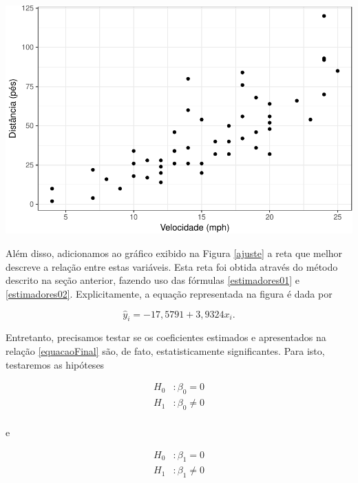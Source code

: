 \documentclass[a4paper,12pt,twoside,printwatermark=false]{modeloLEA}
\numberwithin{equation}{section}
\numberwithin{figure}{section}
\numberwithin{table}{section}
\begin{document}
\begin{center}\includegraphics{Untitled_files/figure-latex/graficoDispersao-1} \end{center}

Além disso, adicionamos ao gráfico exibido na Figura \ref{ajuste} a reta
que melhor descreve a relação entre estas variáveis. Esta reta foi
obtida através do método descrito na seção anterior, fazendo uso das
fórmulas \eqref{estimadores01} e \eqref{estimadores02}. Explicitamente,
a equação representada na figura é dada por

\begin{Shaded}
\begin{Highlighting}[]
\StringTok{ }\OperatorTok{~}\StringTok{ }
\end{Highlighting}
\end{Shaded}

\begin{equation}\label{equacaoFinal}
\widehat{y}_i = -17,5791 + 3,9324x_i.
\end{equation}

Entretanto, precisamos testar se os coeficientes estimados e
apresentados na relação \eqref{equacaoFinal} são, de fato,
estatisticamente significantes. Para isto, testaremos as hipóteses

\begin{align*}
H_0 &: \beta_0 = 0 \\
H_1 &: \beta_0 \neq 0 \\
\end{align*}

\noindent e

\begin{align*}
H_0 &: \beta_1 = 0 \\
H_1 &: \beta_1 \neq 0 \\
\end{align*}
\end{document}
